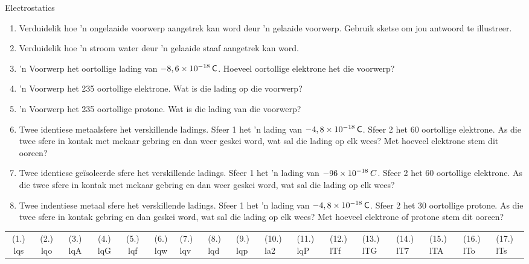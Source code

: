 \begin{eocexercises}{Electrostatics}
\begin{enumerate}[itemsep=5pt, label=\textbf{\arabic*}. ]
\item Verduidelik hoe 'n ongelaaide voorwerp aangetrek kan word deur 'n gelaaide voorwerp. Gebruik sketse om jou antwoord te illustreer. 

\item Verduidelik hoe 'n stroom water deur 'n gelaaide staaf aangetrek kan word.

\item 'n Voorwerp het oortollige lading van $-8,6\ensuremath{\times}{10}^{-18}\phantom{\rule{2pt}{0ex}}\mathsf{C}$. Hoeveel oortollige elektrone het die voorwerp?

\item 'n Voorwerp het 235 oortollige elektrone. Wat is die lading op die voorwerp? 

\item 'n Voorwerp het 235 oortollige protone. Wat is die lading van die voorwerp?

\item Twee identiese metaalsfere het verskillende ladings. Sfeer 1 het 'n lading van $-4,8\ensuremath{\times}{10}^{-18}\phantom{\rule{2pt}{0ex}}\mathsf{C}$. Sfeer 2 het 60 oortollige elektrone. As die twee sfere in kontak met mekaar gebring en dan weer geskei word, wat sal die lading op elk wees? Met hoeveel elektrone stem dit ooreen?

\item Twee identiese ge\"isoleerde sfere het verskillende ladings. Sfeer 1 het 'n lading van $-96\ensuremath{\times}{10}^{-18}\phantom{\rule{2pt}{0ex}}C$. Sfeer 2 het 60 oortollige elektrone. As die twee sfere in kontak met mekaar gebring en dan weer geskei word, wat sal die lading op elk wees?

\item Twee indentiese metaal sfere het verskillende ladings. Sfeer 1 het 'n lading van $-4,8\ensuremath{\times}{10}^{-18}\phantom{\rule{2pt}{0ex}}\mathsf{C}$. Sfeer 2 het 30 oortollige protone. As die twee sfere in kontak gebring en dan geskei word, wat sal die lading op elk wees? Met hoeveel elektrone of protone stem dit ooreen?
            \end{enumerate}
  \label{m38781**end}
  \label{464e844ca5615087ea89d9d95dd9a43a**end}
\practiceinfo
\begin{tabular}[h]{cccccc}
 (1.) lqs  &  (2.) lqo  &  (3.) lqA  &  (4.) lqG  &  (5.) lqf  &  (6.) lqw  &  (7.) lqv  &  (8.) lqd  &  (9.) lqp  &  (10.) la2  &  (11.) lqP  &  (12.) lTf  &  (13.) lTG  &  (14.) lT7  &  (15.) lTA  &  (16.) lTo  &  (17.) lTs  & \end{tabular}
\end{eocexercises}
